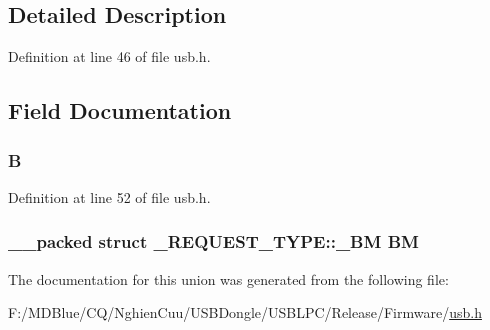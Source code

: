 \subsection{Detailed Description}


Definition at line 46 of file usb.h.



\subsection{Field Documentation}
\hypertarget{union___r_e_q_u_e_s_t___t_y_p_e_abc9e2377dd2619b51b588323fe9984ea}{
\subsubsection[{B}]{ {\bf B}}}
\label{union___r_e_q_u_e_s_t___t_y_p_e_abc9e2377dd2619b51b588323fe9984ea}


Definition at line 52 of file usb.h.

\hypertarget{union___r_e_q_u_e_s_t___t_y_p_e_a896773570e2fb212ad62245fe6e95f94}{
\subsubsection[{BM}]{\setlength{\rightskip}{0pt plus 5cm}\_\-\_\-packed struct {\bf \_\-REQUEST\_\-TYPE::\_\-BM}  {\bf BM}}}
\label{union___r_e_q_u_e_s_t___t_y_p_e_a896773570e2fb212ad62245fe6e95f94}


The documentation for this union was generated from the following file:\begin{DoxyCompactItemize}
\item 
F:/MDBlue/CQ/NghienCuu/USBDongle/USBLPC/Release/Firmware/\hyperlink{usb_8h}{usb.h}\end{DoxyCompactItemize}
